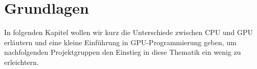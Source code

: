 \chapter{Grundlagen}
\begin{Spacing}{\mylinespace}

In folgenden Kapitel wollen wir kurz die Unterschiede zwischen CPU und GPU erläutern und eine kleine Einführung in GPU-Programmierung geben, um nachfolgenden Projektgruppen den Einstieg in diese Thematik ein wenig zu erleichtern.
\end{Spacing}




\clearpage
